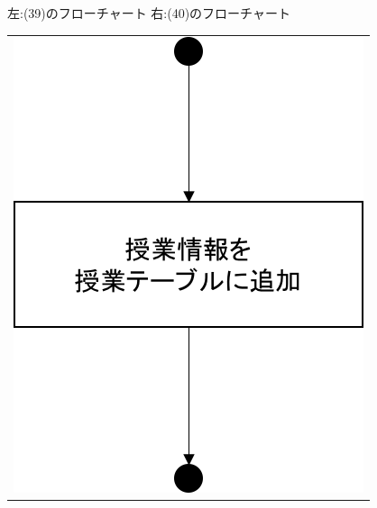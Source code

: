 \begin{figure}[htbp]
\begin{minipage}{0.5\hsize}
\begin{center}
  \end{center}
 \end{minipage}
 \caption{左:(39)のフローチャート 右:(40)のフローチャート}\label{fig:39to40}
\end{figure}

\begin{figure}[htbp]
  \begin{tabular}{c}
 \begin{minipage}{0.33\hsize}
  \begin{center}
   \includegraphics[width=0.8\linewidth,clip]{./img/flow/41.png}
  \end{center}
 \end{minipage}
 \begin{minipage}{0.33\hsize}
  \begin{center}

\end{center}
\end{minipage}
\end{tabular}
\end{figure}
